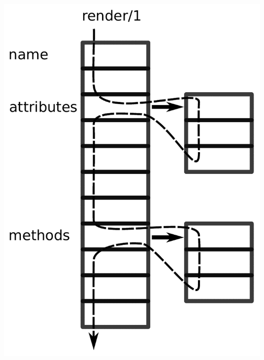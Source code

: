 \documentclass[handout]{beamer}
\begin{document}
\begin{frame}[fragile]
\begin{columns}
\begin{column}{0.4\linewidth}
      \includegraphics[width=1\linewidth]{code_block_class.pdf}
    \end{column}
  \end{columns}
\end{frame}
\end{document}
